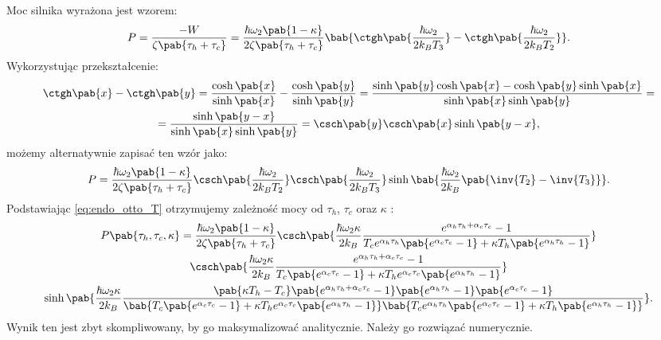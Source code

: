 Moc silnika wyrażona jest wzorem:
\begin{equation*}
	P = \frac{-W}{\zeta\pab{\tau_h + \tau_c}} = \frac{\hbar\omega_2\pab{1-\kappa}}{2\zeta\pab{\tau_h + \tau_c}} \bab{\ctgh\pab{\frac{\hbar\omega_2}{2k_B T_3}} - \ctgh\pab{\frac{\hbar\omega_2}{2k_B T_2}}}.
\end{equation*}
Wykorzystując przekształcenie:
\begin{multline*}
	\ctgh\pab{x} - \ctgh\pab{y} =
	\frac{\cosh\pab{x}}{\sinh\pab{x}} - \frac{\cosh\pab{y}}{\sinh\pab{y}} =
	\frac{\sinh\pab{y}\cosh\pab{x} - \cosh\pab{y}\sinh\pab{x}}{\sinh\pab{x}\sinh\pab{y}} = \\ =
	\frac{\sinh\pab{y-x}}{\sinh\pab{x}\sinh\pab{y}} =
	\csch\pab{y}\csch\pab{x}\sinh\pab{y-x},
\end{multline*}
możemy alternatywnie zapisać ten wzór jako:
\begin{equation*}
	P = \frac{\hbar\omega_2\pab{1-\kappa}}{2\zeta\pab{\tau_h + \tau_c}} \csch\pab{\frac{\hbar\omega_2}{2k_B T_2}} \csch\pab{\frac{\hbar\omega_2}{2k_B T_3}} \sinh\bab{\frac{\hbar\omega_2}{2k_B}\pab{\inv{T_2}-\inv{T_3}}}.
\end{equation*}
Podstawiając \eqref{eq:endo_otto_T} otrzymujemy zależność mocy od \(\tau_h\), \(\tau_c\) oraz \(\kappa\) \cite{endo_otto}:
\begin{multline}
	P\pab{\tau_h,\tau_c,\kappa} =
	\frac{\hbar\omega_2\pab{1-\kappa}}{2\zeta\pab{\tau_h + \tau_c}}
	\csch\pab{\frac{\hbar\omega_2 \kappa}{2k_B}
	\frac{
		e^{\alpha_h \tau_h + \alpha_c \tau_c} - 1
	}{
		T_c e^{\alpha_h \tau_h} \pab{e^{\alpha_c \tau_c} - 1} + \kappa T_h \pab{e^{\alpha_h \tau_h} - 1}
	}} \\
	\csch\pab{\frac{\hbar\omega_2 \kappa}{2k_B}
	\frac{
		e^{\alpha_h \tau_h + \alpha_c \tau_c} - 1
	}{
		T_c \pab{e^{\alpha_c \tau_c} - 1} + \kappa T_h e^{\alpha_c \tau_c} \pab{e^{\alpha_h \tau_h} - 1}
	}} \\
	\sinh\pab{\frac{\hbar\omega_2 \kappa}{2k_B}
	\frac{
	\pab{\kappa T_h - T_c}\pab{e^{\alpha_h \tau_h + \alpha_c \tau_c} - 1}\pab{e^{\alpha_h \tau_h} - 1}\pab{e^{\alpha_c \tau_c} - 1}
	}{
	\bab{T_c \pab{e^{\alpha_c \tau_c} - 1} + \kappa T_h e^{\alpha_c \tau_c} \pab{e^{\alpha_h \tau_h} - 1}}
	\bab{T_c e^{\alpha_h \tau_h} \pab{e^{\alpha_c \tau_c} - 1} + \kappa T_h \pab{e^{\alpha_h \tau_h} - 1}}
	}}.
\end{multline}
Wynik ten jest zbyt skompliwowany, by go maksymalizować analitycznie. Należy go rozwiązać numerycznie.

